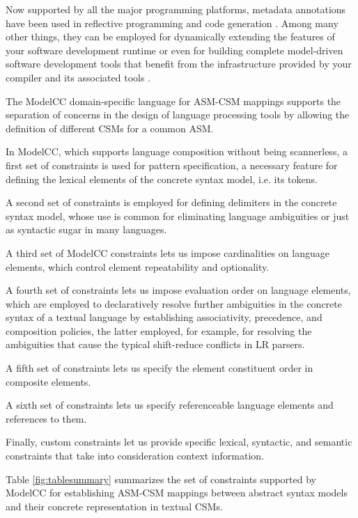 \documentclass[preprint]{elsarticle}
\begin{document}
Now supported by all the major programming platforms, metadata annotations have been used in reflective programming and code generation \cite{Fowler2002}.
Among many other things, they can be employed for dynamically extending the features of your software development runtime \cite{Berzal2005} or even for building complete model-driven software development tools that benefit from the infrastructure provided by your compiler and its associated tools \cite{mdsd-ideal}.

The ModelCC domain-specific language for ASM-CSM mappings \cite{Quesada2014b} supports the separation of concerns in the design of language processing tools by allowing the definition of different CSMs for a common ASM.

In ModelCC, which supports language composition without being scannerless, a first set of constraints is used for pattern specification, a necessary feature for defining the lexical elements of the concrete syntax model, i.e. its tokens.

A second set of constraints is employed for defining delimiters in the concrete syntax model, whose use is common for eliminating language ambiguities or just as syntactic sugar in many languages.

A third set of ModelCC constraints lets us impose cardinalities on language elements, which control element repeatability and optionality.

A fourth set of constraints lets us impose evaluation order on language elements, which are employed to declaratively resolve further ambiguities in the concrete syntax of a textual language by establishing associativity, precedence, and composition policies, the latter employed, for example, for resolving the ambiguities that cause the typical shift-reduce conflicts in LR parsers.

A fifth set of constraints lets us specify the element constituent order in composite elements.

A sixth set of constraints lets us specify referenceable language elements and references to them.

Finally, custom constraints let us provide specific lexical, syntactic, and semantic constraints that take into consideration context information.

Table \ref{fig:tablesummary} summarizes the set of constraints supported by ModelCC for establishing ASM-CSM mappings between abstract syntax models and their concrete representation in textual CSMs.
\end{document}
